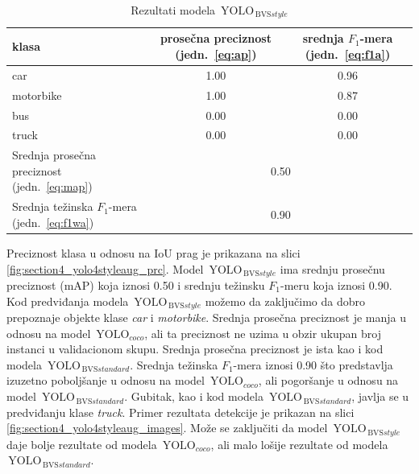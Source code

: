 \documentclass[12pt,oneside]{memoir}
\newcommand{\yolo}{\ensuremath{\,\textrm{YOLO}}}
\newcommand{\bvs}{\ensuremath{\,\textrm{BVS}}}
\begin{document}
\begin{table}
    \begin{center}
    \caption{Rezultati modela $\yolo_{\bvs{style}}$}
        \begin{tabular}{|m{10em}|c|c|}
        \toprule
        klasa     & prosečna preciznost (jedn.~\ref{eq:ap}) & srednja $F_1$-mera (jedn.~\ref{eq:f1a})  \\ \hline
        \midrule
        car       & 1.00   & 0.96 \\ \hline
        motorbike & 1.00   & 0.87 \\ \hline
        bus       & 0.00   & 0.00 \\ \hline
        truck     & 0.00   & 0.00 \\ \hline
        \bottomrule
        Srednja prosečna preciznost (jedn.~\ref{eq:map}) & \multicolumn{2}{c|}{0.50}  \\ \hline
        Srednja težinska $F_1$-mera (jedn.~\ref{eq:f1wa}) & \multicolumn{2}{c|}{0.90}  \\
        \hline
    \end{tabular}
    \label{tab:section4_yolo4styleaug_results}
    \end{center}
\end{table}

Preciznost klasa u odnosu na IoU prag je prikazana na slici \ref{fig:section4_yolo4styleaug_prc}. Model $\yolo_{\bvs{style}}$ ima srednju prosečnu preciznost (mAP) koja iznosi 0.50 i srednju težinsku $F_1$-meru koja iznosi 0.90. Kod predviđanja modela $\yolo_{\bvs{style}}$ možemo da zaključimo da dobro prepoznaje objekte klase \textit{car} i \textit{motorbike}. Srednja prosečna preciznost je manja u odnosu na model $\yolo_{coco}$, ali ta preciznost ne uzima u obzir ukupan broj instanci u validacionom skupu. Srednja prosečna preciznost je ista kao i kod modela  $\yolo_{\bvs{standard}}$. Srednja težinska $F_1$-mera iznosi 0.90 što predstavlja izuzetno poboljšanje u odnosu na model $\yolo_{coco}$, ali pogoršanje u odnosu na model  $\yolo_{\bvs{standard}}$. Gubitak, kao i kod modela  $\yolo_{\bvs{standard}}$, javlja se u predviđanju klase \textit{truck}. Primer rezultata detekcije je prikazan na slici \ref{fig:section4_yolo4styleaug_images}. Može se zaključiti da model $\yolo_{\bvs{style}}$ daje bolje rezultate od modela $\yolo_{coco}$, ali malo lošije rezultate od modela  $\yolo_{\bvs{standard}}$.
\end{document}
